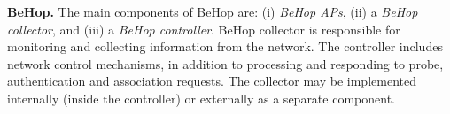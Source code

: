 


\textbf{BeHop.}
%
The main components of BeHop \cite{BeHop} are: (i) \textit{BeHop APs}, (ii) a \textit{BeHop collector}, and (iii) a \textit{BeHop controller}. 
BeHop collector is responsible for monitoring and collecting information from the network.
The controller includes network control mechanisms, in addition to processing and responding to probe, authentication and association requests.
The collector may be implemented internally (inside the controller) or externally as a separate component.



